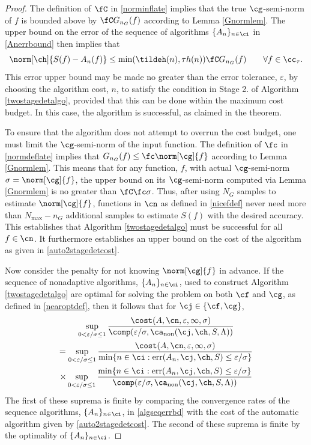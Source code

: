 \documentclass[]{elsarticle}
\DeclareMathOperator{\fix}{non}
\DeclareMathOperator{\err}{err}
\theoremstyle{definition}
\theoremstyle{remark}
\begin{document}
\begin{proof} The definition of $\fC$ in \eqref{norminflate} implies that the true $\cg$-semi-norm of $f$ is bounded above by $\fC G_{n_G}(f)$ according to Lemma \ref{Gnormlem}.  The upper bound on the error of the sequence of algorithms $\{A_n\}_{n \in \ci}$ in \eqref{Anerrbound} then implies that 
\[
\norm[\ch]{S(f) -  A_n(f)} \le \min(\tildeh(n),\tau h(n)) \fC G_{n_G}(f) \qquad \forall f \in \cc_{\tau}.
\]
This error upper bound may be made no greater than the error tolerance, $\varepsilon$, by choosing the algorithm cost, $n$, to satisfy the condition in Stage 2. of Algorithm \ref{twostagedetalgo}, provided that this can be done within the maximum cost budget.  In this case, the algorithm is successful, as claimed in the theorem.

To ensure that the algorithm does not attempt to overrun the cost budget, one must limit the $\cg$-semi-norm of the input function.  The definition of  $\fc$ in \eqref{normdeflate} implies that $G_{n_G}(f) \le \fc\norm[\cg]{f}$ according to Lemma \ref{Gnormlem}. This means that for any function, $f$, with actual $\cg$-semi-norm $\sigma=\norm[\cg]{f}$, the upper bound on its $\cg$-semi-norm computed via Lemma \ref{Gnormlem} is no greater than $\fC \fc \sigma$.  Thus, after using $N_G$ samples to estimate $\norm[\cg]{f}$, functions in $\cn$ as defined in \eqref{nicefdef} never need more than $N_{\max} - n_G$ additional samples to estimate $S(f)$ with the desired accuracy.  This establishes that Algorithm \ref{twostagedetalgo} must be successful for all $f \in \cn$.  It furthermore establishes an upper bound on the cost of the algorithm as given in \eqref{auto2stagedetcost}.

Now consider the penalty for not knowing $\norm[\cg]{f}$ in advance.  If the sequence of nonadaptive algorithms, $\{A_n\}_{n \in \ci}$, used to construct Algorithm \ref{twostagedetalgo} are optimal for solving the problem on both $\cf$ and $\cg$, as defined in \eqref{nearoptdef}, then it follows that for $\cj \in \{\cf,\cg\}$,
\begin{multline*}
\sup_{0 < \varepsilon/\sigma \le 1} \frac{\cost(A,\cn,\varepsilon,\infty,\sigma)} {\comp(\varepsilon/\sigma,\ca_{\fix}(\cj,\ch,S,\Lambda))} \\
= \sup_{0 < \varepsilon/\sigma \le 1} \frac{\cost(A,\cn,\varepsilon,\infty,\sigma)}{\min\{n \in \ci : \err(A_n,\cj,\ch,S) \le \varepsilon/\sigma\}} \\
 \times \sup_{0 < \varepsilon/\sigma \le 1} \frac{\min\{n \in \ci : \err(A_n,\cj,\ch,S) \le \varepsilon/\sigma\}} {\comp(\varepsilon/\sigma,\ca_{\fix}(\cj,\ch,S,\Lambda))}
\end{multline*} 
The first of these suprema is finite by comparing the convergence rates of the sequence algorithms, $\{A_n\}_{n \in \ci}$, in \eqref{algseqerrbd} with the cost of the automatic algorithm given by \eqref{auto2stagedetcost}. The second of these suprema is finite by the optimality of $\{A_n\}_{n \in \ci}$.  
\end{proof}
\end{document}
